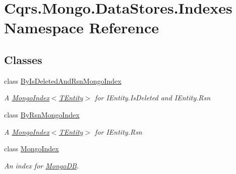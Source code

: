 \hypertarget{namespaceCqrs_1_1Mongo_1_1DataStores_1_1Indexes}{}\section{Cqrs.\+Mongo.\+Data\+Stores.\+Indexes Namespace Reference}
\label{namespaceCqrs_1_1Mongo_1_1DataStores_1_1Indexes}
\subsection*{Classes}
\begin{DoxyCompactItemize}
\item 
class \hyperlink{classCqrs_1_1Mongo_1_1DataStores_1_1Indexes_1_1ByIsDeletedAndRsnMongoIndex}{By\+Is\+Deleted\+And\+Rsn\+Mongo\+Index}
\begin{DoxyCompactList}\small\item\em A \hyperlink{classCqrs_1_1Mongo_1_1DataStores_1_1Indexes_1_1MongoIndex_a7affbb063520cd8c8bda27f8478efd06_a7affbb063520cd8c8bda27f8478efd06}{Mongo\+Index$<$\+T\+Entity$>$} for I\+Entity.\+Is\+Deleted and I\+Entity.\+Rsn \end{DoxyCompactList}\item 
class \hyperlink{classCqrs_1_1Mongo_1_1DataStores_1_1Indexes_1_1ByRsnMongoIndex}{By\+Rsn\+Mongo\+Index}
\begin{DoxyCompactList}\small\item\em A \hyperlink{classCqrs_1_1Mongo_1_1DataStores_1_1Indexes_1_1MongoIndex_a7affbb063520cd8c8bda27f8478efd06_a7affbb063520cd8c8bda27f8478efd06}{Mongo\+Index$<$\+T\+Entity$>$} for I\+Entity.\+Rsn \end{DoxyCompactList}\item 
class \hyperlink{classCqrs_1_1Mongo_1_1DataStores_1_1Indexes_1_1MongoIndex}{Mongo\+Index}
\begin{DoxyCompactList}\small\item\em An index for \hyperlink{namespaceCqrs_1_1MongoDB}{Mongo\+DB}. \end{DoxyCompactList}\end{DoxyCompactItemize}
